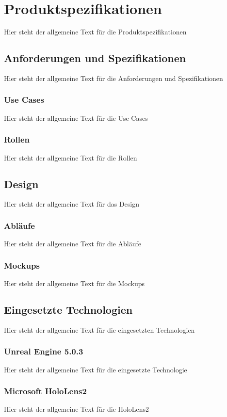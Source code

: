 \chapter{Produktspezifikationen}
Hier steht der allgemeine Text für die Produktspezifikationen

\section{Anforderungen und Spezifikationen}
Hier steht der allgemeine Text für die Anforderungen und Spezifikationen

\subsection{Use Cases}
Hier steht der allgemeine Text für die Use Cases

\subsection{Rollen}
Hier steht der allgemeine Text für die Rollen

\section{Design}
Hier steht der allgemeine Text für das Design

\subsection{Abläufe}
Hier steht der allgemeine Text für die Abläufe

\subsection{Mockups}
Hier steht der allgemeine Text für die Mockups

\section{Eingesetzte Technologien}
Hier steht der allgemeine Text für die eingesetzten Technologien

\subsection{Unreal Engine 5.0.3}
Hier steht der allgemeine Text für die eingesetzte Technologie

\subsection{Microsoft HoloLens2}
Hier steht der allgemeine Text für die HoloLens2
 
